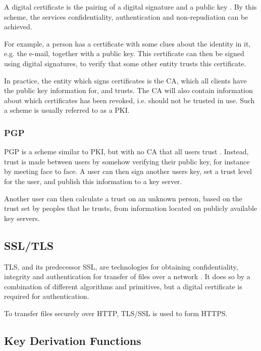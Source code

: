 \documentclass[pdftex,english,10pt,b5paper,twoside]{book}
\begin{document}
A digital certificate is the pairing of a digital signature and a public key
\cite{stallings}. By this scheme, the services confidentiality, authentication
and non-repudiation can be achieved.

For example, a person has a certificate with some clues about the identity
in it, e.g. the e-mail, together with a public key. This certificate can then
be signed using digital signatures, to verify that some other entity trusts this
certificate.

In practice, the entity which signs certificates is the \ac{CA}, which all
clients have the public key information for, and trusts. The \ac{CA} will also
contain information about which certificates has been revoked, i.e. should not
be trusted in use. Such a scheme is usually referred to as a \ac{PKI}.

\subsubsection{PGP}

\ac{PGP} is a scheme similar to \ac{PKI}, but with no \ac{CA} that all users
trust \cite{stallings}. Instead, trust is made between users by somehow
verifying their public key, for instance by meeting face to face. A user can
then sign another users key, set a trust level for the user, and publish this
information to a key server.

Another user can then calculate a trust on an unknown person, based on the trust
set by peoples that he trusts, from information located on publicly
available key servers.

\subsection{SSL/TLS}

\ac{TLS}, and its predecessor \ac{SSL}, are technologies for obtaining
confidentiality, integrity and authentication for transfer of files over a
network \cite{stallings}. It does so by a combination of different algorithms
and primitives, but a digital certificate is required for authentication.

To transfer files securely over \ac{HTTP}, \ac{TLS}/\ac{SSL} is used to form
\ac{HTTPS}.

\subsection{Key Derivation Functions}
\label{sec:PBKDF2}
\end{document}
